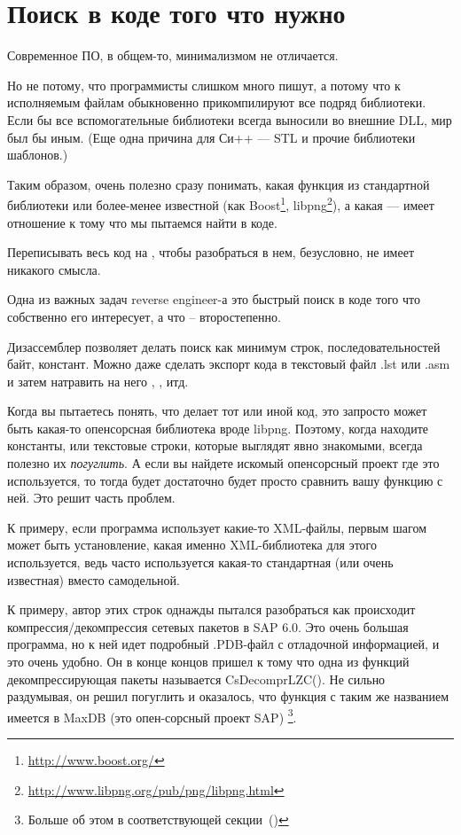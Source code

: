 \chapter{Поиск в коде того что нужно}

Современное ПО, в общем-то, минимализмом не отличается.

Но не потому, что программисты слишком много пишут, 
а потому что к исполняемым файлам обыкновенно прикомпилируют все подряд библиотеки. 
Если бы все вспомогательные библиотеки всегда выносили во внешние DLL, мир был бы иным.
(Еще одна причина для Си++ --- \ac{STL} и прочие библиотеки шаблонов.)

\newcommand{\FOOTNOTEBOOST}{\footnote{\url{http://www.boost.org/}}}
\newcommand{\FOOTNOTELIBPNG}{\footnote{\url{http://www.libpng.org/pub/png/libpng.html}}}

Таким образом, очень полезно сразу понимать, какая функция из стандартной библиотеки или 
более-менее известной (как Boost\FOOTNOTEBOOST, libpng\FOOTNOTELIBPNG), 
а какая --- имеет отношение к тому что мы пытаемся найти в коде.

Переписывать весь код на \CCpp, чтобы разобраться в нем, безусловно, не имеет никакого смысла.

Одна из важных задач reverse engineer-а это быстрый поиск в коде того что собственно его интересует, а что -- второстепенно.

\myindex{\GrepUsage}
Дизассемблер \IDA позволяет делать поиск как минимум строк, последовательностей байт, констант.
Можно даже сделать экспорт кода в текстовый файл .lst или .asm и затем натравить на него , , итд.

Когда вы пытаетесь понять, что делает тот или иной код, это запросто может быть какая-то 
опенсорсная библиотека вроде libpng. Поэтому, когда находите константы, или текстовые строки, которые 
выглядят явно знакомыми, всегда полезно их \emph{погуглить}.
А если вы найдете искомый опенсорсный проект где это используется, 
то тогда будет достаточно будет просто сравнить вашу функцию с ней. 
Это решит часть проблем.

К примеру, если программа использует какие-то XML-файлы, первым шагом может быть
установление, какая именно XML-библиотека для этого используется, ведь часто используется какая-то
стандартная (или очень известная) вместо самодельной.

К примеру, автор этих строк однажды пытался разобраться как происходит компрессия/декомпрессия сетевых пакетов в SAP 6.0. 
Это очень большая программа, но к ней идет подробный .\gls{PDB}-файл с отладочной информацией, и это очень удобно. 
Он в конце концов пришел к тому что одна из функций декомпрессирующая пакеты называется CsDecomprLZC(). 
Не сильно раздумывая, он решил погуглить и оказалось, что функция с таким же названием имеется в MaxDB
(это опен-сорсный проект SAP) \footnote{Больше об этом в соответствующей секции~()}.

